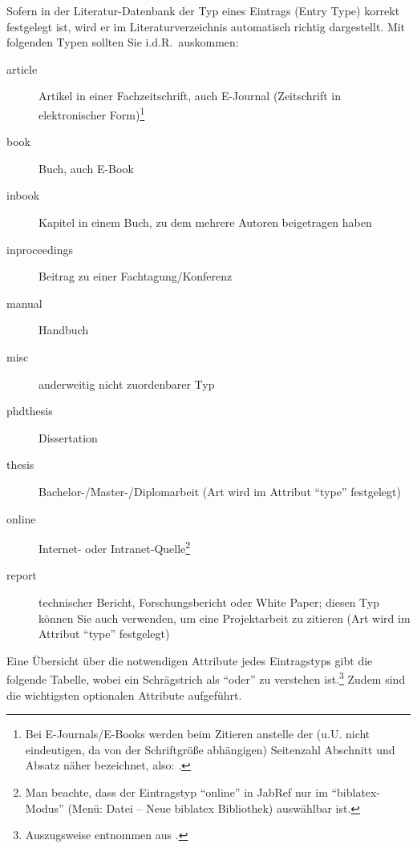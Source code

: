 Sofern in der Literatur-Datenbank der Typ eines Eintrags (Entry Type) korrekt festgelegt ist, wird er im Literaturverzeichnis automatisch richtig dargestellt. Mit folgenden Typen sollten Sie i.d.R.\ auskommen:
\begin{description}
\item[article] Artikel in einer Fachzeitschrift, auch E-Journal (Zeitschrift in elektronischer Form)\footnote{Bei E-Journals/E-Books werden beim Zitieren anstelle der (u.U. nicht eindeutigen, da von der Schriftgröße abhängigen) Seitenzahl Abschnitt und Absatz näher bezeichnet, also: \cite[Abschnitt 1.2.3, Absatz 4]{Staab}.}
\item[book] Buch, auch E-Book 
\item[inbook] Kapitel in einem Buch, zu dem mehrere Autoren beigetragen haben 
\item[inproceedings] Beitrag zu einer Fachtagung/Konferenz 
\item[manual] Handbuch
\item[misc] anderweitig nicht zuordenbarer Typ
\item[phdthesis] Dissertation
\item[thesis] Bachelor-/Master-/Diplomarbeit (Art wird im Attribut \enquote{type} festgelegt) 
\item[online] Internet- oder Intranet-Quelle\footnote{\label{fn:onlineEntryType}Man beachte, dass der Eintragstyp \enquote{online} in JabRef nur im \enquote{biblatex-Modus} (Menü: Datei -- Neue biblatex Bibliothek) auswählbar ist.}
\item[report] technischer Bericht, Forschungsbericht oder White Paper; diesen Typ können Sie auch verwenden, um eine Projektarbeit zu zitieren (Art wird im Attribut \enquote{type} festgelegt) 
\end{description} 

Eine Übersicht über die notwendigen Attribute jedes Eintragstyps gibt die folgende Tabelle, wobei ein Schrägstrich als \enquote{oder} zu verstehen ist.\footnote{Auszugsweise entnommen aus \cite{biblatex:manual}.} Zudem sind die wichtigsten optionalen Attribute aufgeführt.

